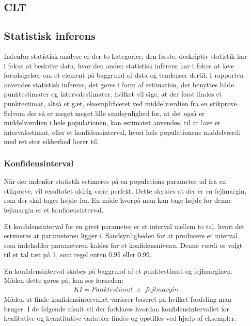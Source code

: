 \documentclass[
]{article}
\begin{document}
\hypertarget{clt}{%
\subsection{CLT}\label{clt}}

\hypertarget{statistisk-inferens}{%
\subsection{Statistisk inferens}\label{statistisk-inferens}}

Indenfor statistisk analyse er der to kategorier; den første, deskriptiv
statistik har i fokus at beskrive data, hvor den anden statistisk
inferens har i fokus at lave forudsigelser om et element på baggrund af
data og tendenser dertil. I rapporten anvendes statistisk inferens, det
gøres i form af estimation, der benyttes både punktestimater og
intervalestimater, hvilket vil sige, at der først findes et
punktestimat, altså et gæt, eksemplificeret ved middelværdien fra en
stikprøve. Selvom der så er meget meget lille sandsynlighed for, at det
også er middelværdien i hele populationen, kan estimatet anvendes, til
at lave et intervalestimat, eller et konfidensinterval, hvori hele
populationens middelværdi med ret stor sikkerhed hører til.

\hypertarget{konfidensinterval}{%
\subsubsection{Konfidensinterval}\label{konfidensinterval}}

Når der indenfor statistik estimeres på en populations parameter ud fra
en stikprøve, vil resultatet aldrig være perfekt. Dette skyldes at der
er en fejlmargin, som der skal tages højde fra. En måde hvorpå man kan
tage højde for denne fejlmargin er et konfidensinterval.

Et konfidensinterval for en givet parameter er et interval mellem to
tal, hvori det estimeres at parameteren ligger i. Sandsynligheden for at
producere et interval som indeholder parameteren kaldes for et
konfidensniveau. Denne værdi er valgt til et tal tæt på 1, som regel
enten 0.95 eller 0.99.

En konfidensinterval skabes på baggrund af et punktestimat og
fejlmarginen. Måden dette gøres på, kan ses forneden: \[
\begin{aligned}
KI = Punktestimat \; \pm \; fejlmargin
\end{aligned}
\] Måden at finde konfidensintervallet varierer baseret på hvilket
fordeling man bruger. I de følgende afsnit vil der forklares hvordan
konfidensintervallet for kvalitative og kvantitative variabler findes og
opstilles ved hjælp af eksempler.
\end{document}
